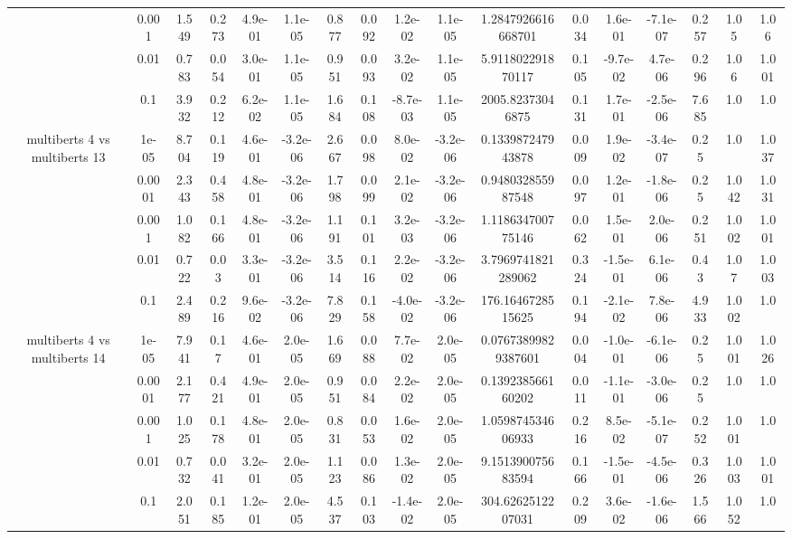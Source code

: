\begin{tabular}{|c|c|c|c|c|c|c|c|c|c|c|c|c|c|c|c|c|}
 & 0.001 & 1.549 & 0.273 & 4.9e-01 & 1.1e-05 & 0.877 & 0.092 & 1.2e-02 & 1.1e-05 & 1.2847926616668701 & 0.034 & 1.6e-01 & -7.1e-07 & 0.257 & 1.05 & 1.06 \\
 & 0.01 & 0.783 & 0.054 & 3.0e-01 & 1.1e-05 & 0.951 & 0.093 & 3.2e-02 & 1.1e-05 & 5.911802291870117 & 0.105 & -9.7e-02 & 4.7e-06 & 0.296 & 1.06 & 1.001 \\
 & 0.1 & 3.932 & 0.212 & 6.2e-02 & 1.1e-05 & 1.684 & 0.108 & -8.7e-03 & 1.1e-05 & 2005.82373046875 & 0.131 & 1.7e-01 & -2.5e-06 & 7.685 & 1.0 & 1.0 \\
\hline
\multirow{5}{*}{multiberts 4 vs multiberts 13} & 1e-05 & 8.704 & 0.119 & 4.6e-01 & -3.2e-06 & 2.667 & 0.098 & 8.0e-02 & -3.2e-06 & 0.133987247943878 & 0.009 & 1.9e-02 & -3.4e-07 & 0.25 & 1.0 & 1.037 \\
 & 0.0001 & 2.343 & 0.458 & 4.8e-01 & -3.2e-06 & 1.798 & 0.099 & 2.1e-02 & -3.2e-06 & 0.948032855987548 & 0.097 & 1.2e-01 & -1.8e-06 & 0.25 & 1.042 & 1.031 \\
 & 0.001 & 1.082 & 0.166 & 4.8e-01 & -3.2e-06 & 1.191 & 0.101 & 3.2e-03 & -3.2e-06 & 1.118634700775146 & 0.062 & 1.5e-01 & 2.0e-06 & 0.251 & 1.002 & 1.001 \\
 & 0.01 & 0.722 & 0.03 & 3.3e-01 & -3.2e-06 & 3.514 & 0.116 & 2.2e-02 & -3.2e-06 & 3.7969741821289062 & 0.324 & -1.5e-01 & 6.1e-06 & 0.43 & 1.07 & 1.003 \\
 & 0.1 & 2.489 & 0.216 & 9.6e-02 & -3.2e-06 & 7.829 & 0.158 & -4.0e-02 & -3.2e-06 & 176.1646728515625 & 0.194 & -2.1e-02 & 7.8e-06 & 4.933 & 1.002 & 1.0 \\
\hline
\multirow{5}{*}{multiberts 4 vs multiberts 14} & 1e-05 & 7.941 & 0.17 & 4.6e-01 & 2.0e-05 & 1.669 & 0.088 & 7.7e-02 & 2.0e-05 & 0.07673899829387601 & 0.004 & -1.0e-01 & -6.1e-06 & 0.25 & 1.001 & 1.026 \\
 & 0.0001 & 2.177 & 0.421 & 4.9e-01 & 2.0e-05 & 0.951 & 0.084 & 2.2e-02 & 2.0e-05 & 0.139238566160202 & 0.011 & -1.1e-01 & -3.0e-06 & 0.25 & 1.0 & 1.0 \\
 & 0.001 & 1.025 & 0.178 & 4.8e-01 & 2.0e-05 & 0.831 & 0.053 & 1.6e-02 & 2.0e-05 & 1.059874534606933 & 0.216 & 8.5e-02 & -5.1e-07 & 0.252 & 1.001 & 1.0 \\
 & 0.01 & 0.732 & 0.041 & 3.2e-01 & 2.0e-05 & 1.123 & 0.086 & 1.3e-02 & 2.0e-05 & 9.151390075683594 & 0.166 & -1.5e-01 & -4.5e-06 & 0.326 & 1.003 & 1.001 \\
 & 0.1 & 2.051 & 0.185 & 1.2e-01 & 2.0e-05 & 4.537 & 0.103 & -1.4e-02 & 2.0e-05 & 304.6262512207031 & 0.209 & 3.6e-02 & -1.6e-06 & 1.566 & 1.052 & 1.0 \\

\end{tabular}
